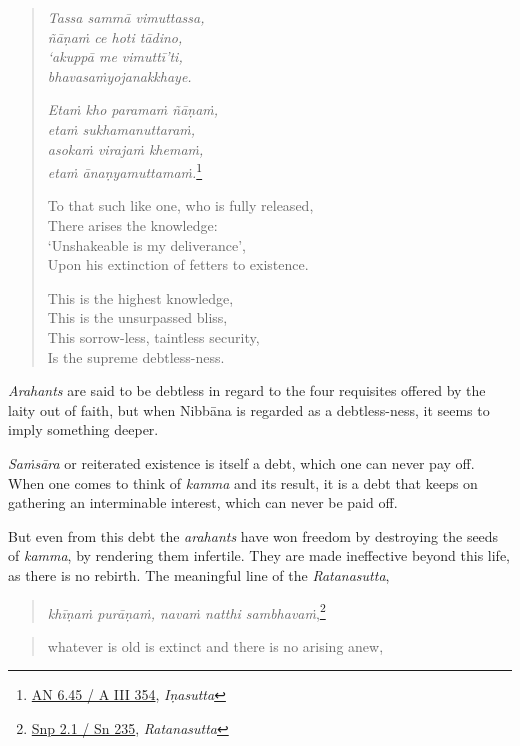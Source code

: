 \begin{quote}
\emph{Tassa sammā vimuttassa,}\\
\emph{ñāṇaṁ ce hoti tādino,}\\
\emph{`akuppā me vimuttī'ti,}\\
\emph{bhavasaṁyojanakkhaye.}

\emph{Etaṁ kho paramaṁ ñāṇaṁ,}\\
\emph{etaṁ sukhamanuttaraṁ,}\\
\emph{asokaṁ virajaṁ khemaṁ,}\\
\emph{etaṁ ānaṇyamuttamaṁ.}\footnote{\href{https://suttacentral.net/an6.45/pli/ms}{AN 6.45 / A III 354}, \emph{Iṇasutta}}

To that such like one, who is fully released,\\
There arises the knowledge:\\
`Unshakeable is my deliverance',\\
Upon his extinction of fetters to existence.

This is the highest knowledge,\\
This is the unsurpassed bliss,\\
This sorrow-less, taintless security,\\
Is the supreme debtless-ness.
\end{quote}

\emph{Arahants} are said to be debtless in regard to the four requisites offered by the laity out of faith, but when Nibbāna is regarded as a debtless-ness, it seems to imply something deeper.

\emph{Saṁsāra} or reiterated existence is itself a debt, which one can never pay off. When one comes to think of \emph{kamma} and its result, it is a debt that keeps on gathering an interminable interest, which can never be paid off.

But even from this debt the \emph{arahants} have won freedom by destroying the seeds of \emph{kamma}, by rendering them infertile. They are made ineffective beyond this life, as there is no rebirth. The meaningful line of the \emph{Ratanasutta},

\begin{quote}
\emph{khīṇaṁ purāṇaṁ, navaṁ natthi sambhavaṁ},\footnote{\href{https://suttacentral.net/snp2.1/pli/ms}{Snp 2.1 / Sn 235}, \emph{Ratanasutta}}
\end{quote}

\begin{quote}
whatever is old is extinct and there is no arising anew,
\end{quote}

